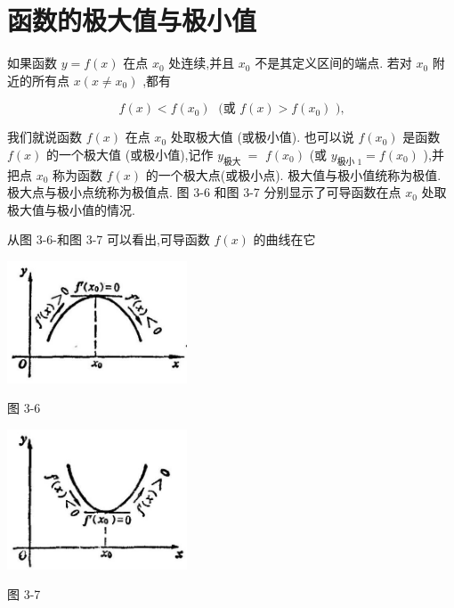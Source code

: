\documentclass[lang=cn,newtx,10pt,scheme=chinese]{elegantbook}
\begin{document}
\section{函数的极大值与极小值}

如果函数 \(y = f\left( x\right)\) 在点 \({x}_{0}\) 处连续,并且 \({x}_{0}\) 不是其定义区间的端点. 若对 \({x}_{0}\) 附近的所有点 \(x\left( {x \neq {x}_{0}}\right)\) ,都有

\[
f\left( x\right) < f\left( {x}_{0}\right) \;\text{ (或 }f\left( x\right) > f\left( {x}_{0}\right) \text{ ),}
\]

我们就说函数 \(f\left( x\right)\) 在点 \({x}_{0}\) 处取极大值 (或极小值). 也可以说 \(f\left( {x}_{0}\right)\) 是函数 \(f\left( x\right)\) 的一个极大值 (或极小值),记作 \({y}_{\text{极大 }} =\) \(f\left( {x}_{0}\right)\) (或 \({y}_{\text{极小 }1} = f\left( {x}_{0}\right)\) ),并把点 \({x}_{0}\) 称为函数 \(f\left( x\right)\) 的一个极大点(或极小点). 极大值与极小值统称为极值. 极大点与极小点统称为极值点. 图 3-6 和图 3-7 分别显示了可导函数在点 \({x}_{0}\) 处取极大值与极小值的情况.

从图 3-6-和图 3-7 可以看出,可导函数 \(f\left( x\right)\) 的曲线在它

\begin{center}
\includegraphics[max width=0.4\textwidth]{images/01912c18-5c3f-733d-b775-749ba9897a9d_141_386711.jpg}
\end{center}

图 3-6

\begin{center}
\includegraphics[max width=0.4\textwidth]{images/01912c18-5c3f-733d-b775-749ba9897a9d_141_950727.jpg}
\end{center}

图 3-7
\end{document}
